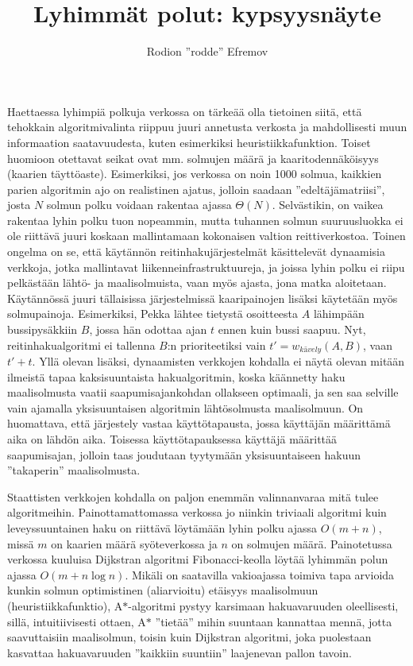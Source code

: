 \documentclass[12pt]{article}
\title{Lyhimmät polut: kypsyysnäyte}
\author{Rodion ''rodde'' Efremov}
\begin{document}
\maketitle
\newpage

\noindent Haettaessa lyhimpiä polkuja verkossa on tärkeää olla tietoinen siitä, että tehokkain algoritmivalinta riippuu juuri annetusta verkosta ja mahdollisesti muun informaation saatavuudesta, kuten esimerkiksi heuristiikkafunktion. Toiset huomioon otettavat seikat ovat mm. solmujen määrä ja kaaritodennäköisyys (kaarien täyttöaste). Esimerkiksi, jos verkossa on noin 1000 solmua, kaikkien parien algoritmin ajo on realistinen ajatus, jolloin saadaan ''edeltäjämatriisi'', josta $N$ solmun polku voidaan rakentaa ajassa $\Theta(N)$. Selvästikin, on vaikea rakentaa lyhin polku tuon nopeammin, mutta tuhannen solmun suuruusluokka ei ole riittävä juuri koskaan mallintamaan kokonaisen valtion reittiverkostoa. Toinen ongelma on se, että käytännön reitinhakujärjestelmät käsittelevät dynaamisia verkkoja, jotka mallintavat liikenneinfrastruktuureja, ja joissa lyhin polku ei riipu pelkästään lähtö- ja maalisolmuista, vaan myös ajasta, jona matka aloitetaan. Käytännössä juuri tällaisissa järjestelmissä kaaripainojen lisäksi käytetään myös solmupainoja. Esimerkiksi, Pekka lähtee tietystä osoitteesta $A$ lähimpään bussipysäkkiin $B$, jossa hän odottaa ajan $t$ ennen kuin bussi saapuu. Nyt, reitinhakualgoritmi ei tallenna $B$:n prioriteetiksi vain $t' = w_{kävely}(A, B)$, vaan $t' + t$. Yllä olevan lisäksi, dynaamisten verkkojen kohdalla ei näytä olevan mitään ilmeistä tapaa kaksisuuntaista hakualgoritmin, koska käännetty haku maalisolmusta vaatii saapumisajankohdan ollakseen optimaali, ja sen saa selville vain ajamalla yksisuuntaisen algoritmin lähtösolmusta maalisolmuun. On huomattava, että järjestely vastaa käyttötapausta, jossa käyttäjän määrittämä aika on lähdön aika. Toisessa käyttötapauksessa käyttäjä määrittää saapumisajan, jolloin taas joudutaan tyytymään yksisuuntaiseen hakuun ''takaperin'' maalisolmusta.

Staattisten verkkojen kohdalla on paljon enemmän valinnanvaraa mitä tulee algoritmeihin. Painottamattomassa verkossa jo niinkin triviaali algoritmi kuin leveyssuuntainen haku on riittävä löytämään lyhin polku ajassa $O(m + n)$, missä $m$ on kaarien määrä syöteverkossa ja $n$ on solmujen määrä. Painotetussa verkossa kuuluisa Dijkstran algoritmi Fibonacci-keolla löytää lyhimmän polun ajassa $O(m + n \log n)$. Mikäli on saatavilla vakioajassa toimiva tapa arvioida kunkin solmun optimistinen (aliarvioitu) etäisyys maalisolmuun (heuristiikkafunktio), A$\ast$-algoritmi pystyy karsimaan hakuavaruuden oleellisesti, sillä, intuitiivisesti ottaen, A$\ast$ ''tietää'' mihin suuntaan kannattaa mennä, jotta saavuttaisiin maalisolmun, toisin kuin Dijkstran algoritmi, joka puolestaan kasvattaa hakuavaruuden ''kaikkiin suuntiin'' laajenevan pallon tavoin. 
\end{document}
